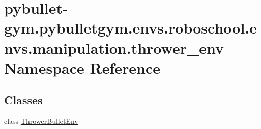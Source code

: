 \hypertarget{namespacepybullet-gym_1_1pybulletgym_1_1envs_1_1roboschool_1_1envs_1_1manipulation_1_1thrower__env}{}\section{pybullet-\/gym.pybulletgym.\+envs.\+roboschool.\+envs.\+manipulation.\+thrower\+\_\+env Namespace Reference}
\label{namespacepybullet-gym_1_1pybulletgym_1_1envs_1_1roboschool_1_1envs_1_1manipulation_1_1thrower__env}
\subsection*{Classes}
\begin{DoxyCompactItemize}
\item 
class \hyperlink{classpybullet-gym_1_1pybulletgym_1_1envs_1_1roboschool_1_1envs_1_1manipulation_1_1thrower__env_1_1_thrower_bullet_env}{Thrower\+Bullet\+Env}
\end{DoxyCompactItemize}
